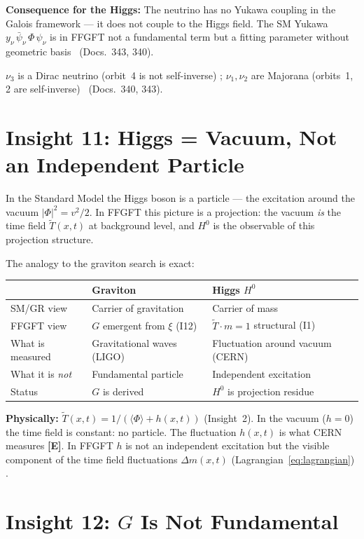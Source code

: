 \textbf{Consequence for the Higgs:} The neutrino has no Yukawa coupling
in the Galois framework --- it does not couple to the Higgs field. The SM
Yukawa $y_\nu\,\bar\psi_\nu\,\Phi\,\psi_\nu$ is in FFGFT not a fundamental
term but a fitting parameter without geometric basis \BM\ (Docs.~343, 340).

$\nu_3$ is a Dirac neutrino (orbit~4 is not self-inverse) \BM;
$\nu_1, \nu_2$ are Majorana (orbits~1, 2 are self-inverse) \BM\
(Docs.~340, 343).

\section{Insight 11: Higgs = Vacuum, Not an Independent Particle}

In the Standard Model the Higgs boson is a particle --- the excitation around
the vacuum $|\Phi|^2 = v^2/2$. In FFGFT this picture is a projection:
the vacuum \emph{is} the time field $\tilde{T}(x,t)$ at background level,
and $H^0$ is the observable of this projection structure.

The analogy to the graviton search is exact:

\begin{center}\small
\begin{tabular}{@{}p{3.5cm}p{5cm}p{5cm}@{}}
\toprule
& Graviton & Higgs $H^0$ \\
\midrule
SM/GR view & Carrier of gravitation & Carrier of mass \\
FFGFT view & $G$ emergent from $\xi$ (I12) & $\tilde{T}\cdot m=1$ structural (I1) \\
What is measured & Gravitational waves (LIGO) & Fluctuation around vacuum (CERN) \\
What it is \emph{not} & Fundamental particle & Independent excitation \\
Status & $G$ is derived \KM & $H^0$ is projection residue \BM \\
\bottomrule
\end{tabular}
\end{center}

\textbf{Physically:} $\tilde{T}(x,t) = 1/(\langle\Phi\rangle + h(x,t))$
(Insight~2). In the vacuum ($h = 0$) the time field is constant: no particle.
The fluctuation $h(x,t)$ is what CERN measures \textbf{[E]}. In FFGFT $h$ is not an
independent excitation but the visible component of the time field
fluctuations $\Delta m(x,t)$ (Lagrangian~\eqref{eq:lagrangian}) \BM.

\section{Insight 12: $G$ Is Not Fundamental}

